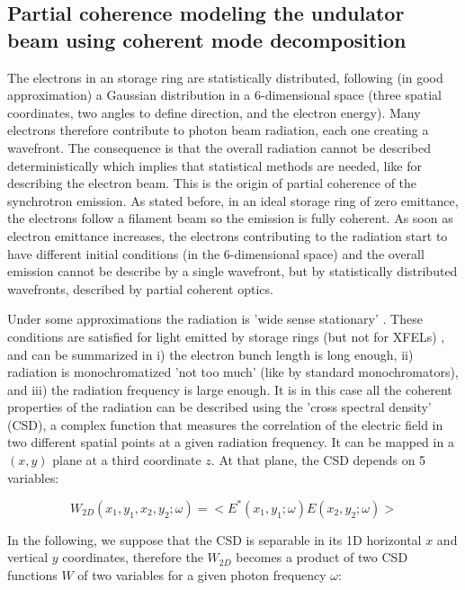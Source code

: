 \documentclass{iucr}              %
\begin{document}
\subsection{Partial coherence modeling the undulator beam using coherent mode decomposition}

The electrons in an storage ring are statistically distributed, following (in good approximation) a Gaussian distribution in a 6-dimensional space (three spatial coordinates, two angles to define direction, and the electron energy). Many electrons therefore contribute to photon beam radiation, each one creating a wavefront. The consequence is that the overall radiation cannot be described deterministically which implies that statistical methods are needed, like for describing the electron beam. This is the origin of partial coherence of the synchrotron emission. As stated before, in an ideal storage ring of zero emittance, the electrons follow a filament beam so the emission is fully coherent. As soon as  electron emittance increases, the electrons contributing to the radiation start to have different initial conditions (in the 6-dimensional space) and the overall emission cannot be describe by a single wavefront, but by statistically distributed wavefronts, described by partial coherent optics.

Under some approximations the radiation is 'wide sense stationary' \cite{mandel_wolf}. These conditions are satisfied for light emitted by storage rings (but not for XFELs) \cite{geloni2008}, and can be summarized in
i) the electron bunch length is long enough,
ii) radiation is monochromatized 'not too much' (like by standard monochromators), and 
iii) the radiation frequency is large enough.
It is in this case all the coherent properties of the radiation can be described using the 'cross spectral density' (CSD), a complex function that measures the correlation of the electric field in two different spatial points at a given radiation frequency. It can be mapped in a $(x,y)$ plane at a third coordinate $z$. At that plane, the CSD depends on 5 variables: 

\begin{equation}
W_{2D}(x_1,y_1,x_2,y_2;\omega) = <E^*(x_1,y_1;\omega) E(x_2,y_2;\omega)>
\label{eq:CSD_1D}
\end{equation}

In the following, we suppose that the CSD is separable in its 1D horizontal $x$ and vertical $y$ coordinates, therefore the $W_{2D}$ becomes a product of two CSD functions $W$ of two variables for a given photon frequency $\omega$:
\end{document}
